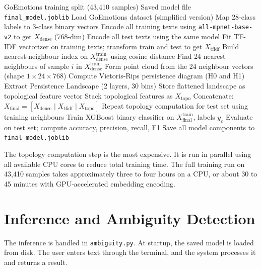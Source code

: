 \begin{algorithm}[H]
\caption{Training Pipeline}
\label{alg:train}
\begin{algorithmic}[1]
\Require GoEmotions training split (43,410 samples)
\Ensure Saved model file \texttt{final\_model.joblib}
\State Load GoEmotions dataset (simplified version)
\State Map 28-class labels to 3-class binary vectors
\State Encode all training texts using \texttt{all-mpnet-base-v2} to get $X_{\text{dense}}$ (768-dim)
\State Encode all test texts using the same model
\State Fit TF-IDF vectorizer on training texts; transform train and test to get $X_{\text{tfidf}}$
\State Build nearest-neighbour index on $X^{\text{train}}_{\text{dense}}$ using cosine distance
    \State Find 24 nearest neighbours of sample $i$ in $X^{\text{train}}_{\text{dense}}$
    \State Form point cloud from the 24 neighbour vectors (shape $1 \times 24 \times 768$)
    \State Compute Vietoris-Rips persistence diagram (H0 and H1)
    \State Extract Persistence Landscape (2 layers, 30 bins)
    \State Store flattened landscape as topological feature vector
\EndFor
\State Stack topological features as $X_{\text{topo}}$
\State Concatenate: $X_{\text{final}} = [X_{\text{dense}} \mid X_{\text{tfidf}} \mid X_{\text{topo}}]$
\State Repeat topology computation for test set using training neighbours
    \State Train XGBoost binary classifier on $X^{\text{train}}_{\text{final}}$, labels $y_c$
\EndFor
\State Evaluate on test set; compute accuracy, precision, recall, F1
\State Save all model components to \texttt{final\_model.joblib}
\end{algorithmic}
\end{algorithm}

The topology computation step is the most expensive. It is run in parallel using all available
CPU cores to reduce total training time. The full training run on 43,410 samples takes
approximately three to four hours on a CPU, or about 30 to 45 minutes with GPU-accelerated
embedding encoding.

\section{Inference and Ambiguity Detection}

The inference is handled in \texttt{ambiguity.py}. At startup, the saved model is loaded from
disk. The user enters text through the terminal, and the system processes it and returns a result.

